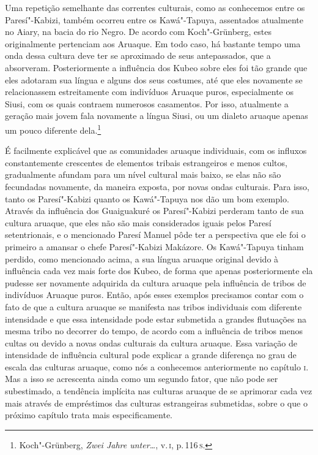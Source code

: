 Uma repetição semelhante das correntes culturais, como as conhecemos
entre os Paresí"-Kabizi, também ocorreu entre os Kawá"-Tapuya, assentados
atualmente no Aiary, na bacia do rio Negro. De acordo com Koch"-Grünberg,
estes originalmente pertenciam aos Aruaque. Em todo caso, há bastante
tempo uma onda dessa cultura deve ter se aproximado de seus
antepassados, que a absorveram. Posteriormente a influência dos Kubeo
sobre eles foi tão grande que eles adotaram sua língua e alguns dos seus
costumes, até que eles novamente se relacionassem estreitamente com
indivíduos Aruaque puros, especialmente os Siusi, com os quais contraem numerosos
casamentos. Por isso, atualmente a geração mais jovem fala novamente a
língua Siusi, ou um dialeto aruaque apenas um pouco diferente
dela.\footnote{Koch"-Grünberg, \textit{Zwei Jahre unter\ldots}, v.\,\textsc{i}, p.\,116\,\textsc{s}.}

É facilmente explicável que as comunidades aruaque individuais, com os
influxos constantemente crescentes de elementos tribais estrangeiros e
menos cultos, gradualmente afundam para um nível cultural mais baixo,
se elas não são fecundadas novamente, da maneira exposta, por novas
ondas culturais. Para isso, tanto os Paresí"-Kabizi quanto os
Kawá"-Tapuya nos dão um bom exemplo. Através da influência dos
Guaiguakuré os Paresí"-Kabizi perderam tanto de sua cultura aruaque, que
eles não são mais considerados iguais pelos Paresí setentrionais, e o
mencionado Paresí Manuel pôde ter a perspectiva que ele foi o primeiro a
amansar o chefe Paresí"-Kabizi Makázore. Os Kawá"-Tapuya tinham perdido,
como mencionado acima, a sua língua aruaque original devido à
influência cada vez mais forte dos Kubeo, de forma que apenas
posteriormente ela pudesse ser novamente adquirida da cultura aruaque
pela influência de tribos de indivíduos Aruaque puros. Então, após esses exemplos
precisamos contar com o fato de que a cultura aruaque se manifesta nas
tribos individuais com diferente intensidade e que essa intensidade pode
estar submetida a grandes flutuações na mesma tribo no decorrer do
tempo, de acordo com a influência de tribos menos cultas ou devido a
novas ondas culturais da cultura aruaque. Essa variação de intensidade
de influência cultural pode explicar a grande diferença no grau de
escala das culturas aruaque, como nós a conhecemos anteriormente no
capítulo \textsc{i}. Mas a isso se acrescenta ainda como um segundo fator, que
não pode ser subestimado, a tendência implícita nas culturas aruaque de
se aprimorar cada vez mais através de empréstimos das culturas
estrangeiras submetidas, sobre o que o próximo capítulo trata mais
especificamente.



